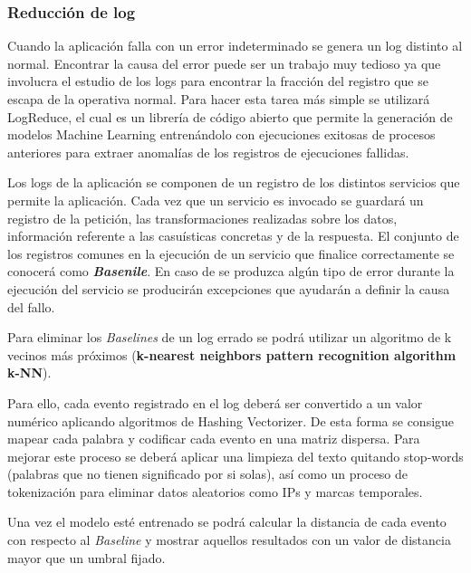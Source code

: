 \subsubsection{Reducción de log}
\label{sec:log_reduction}

Cuando la aplicación falla con un error indeterminado se genera un log distinto al normal. Encontrar la causa del error puede ser un trabajo muy tedioso ya que involucra el estudio de los logs para encontrar la fracción del registro que se escapa de la operativa normal. Para hacer esta tarea más simple se utilizará LogReduce, el cual es un librería de código abierto que permite la generación de modelos Machine Learning entrenándolo con ejecuciones exitosas de procesos anteriores para extraer anomalías de los registros de ejecuciones fallidas.

Los logs de la aplicación se componen de un registro de los distintos servicios que permite la aplicación. Cada vez que un servicio es invocado se guardará un registro de la petición, las transformaciones realizadas sobre los datos, información referente a las casuísticas concretas y de la respuesta. El conjunto de los registros comunes en la ejecución de un servicio que finalice correctamente se conocerá como \textbf{\textit{Basenile}}.  En caso de se produzca algún tipo de error durante la ejecución del servicio se producirán excepciones que ayudarán a definir la causa del fallo.


Para eliminar los \textit{Baselines} de un log errado se podrá utilizar un algoritmo de k vecinos más próximos (\textbf{k-nearest neighbors pattern recognition algorithm k-NN}). 

Para ello, cada evento registrado en el log deberá ser convertido a un valor numérico aplicando algoritmos de Hashing Vectorizer. De esta forma se consigue mapear cada palabra y codificar cada evento en una matriz dispersa. Para mejorar este proceso se deberá aplicar una limpieza del texto quitando stop-words (palabras que no tienen significado por si solas), así como un proceso de tokenización para eliminar datos aleatorios como IPs y marcas temporales.

Una vez el modelo esté entrenado se podrá calcular la distancia de cada evento con respecto al \textit{Baseline} y mostrar aquellos resultados con un valor de distancia mayor que un umbral fijado. 

